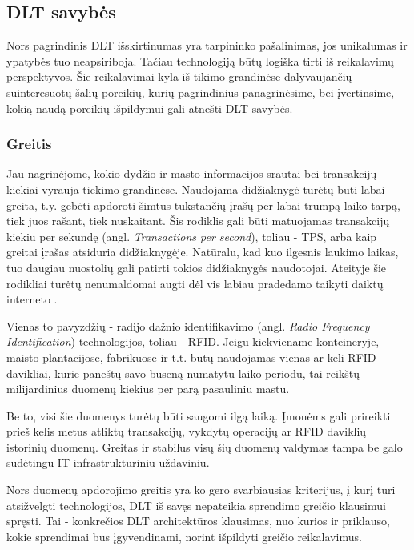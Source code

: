 \subsection{DLT savybės}

Nors pagrindinis DLT išskirtinumas yra tarpininko pašalinimas, jos unikalumas ir ypatybės tuo neapsiriboja. Tačiau technologiją būtų logiška tirti iš reikalavimų perspektyvos. Šie reikalavimai kyla iš tikimo grandinėse dalyvaujančių suinteresuotų šalių poreikių, kurių pagrindinius panagrinėsime, bei įvertinsime, kokią naudą poreikių išpildymui gali atnešti DLT savybės.

\subsubsection{Greitis}

Jau nagrinėjome, kokio dydžio ir masto informacijos srautai bei transakcijų kiekiai vyrauja tiekimo grandinėse. Naudojama didžiaknygė turėtų būti labai greita, t.y. gebėti apdoroti šimtus tūkstančių įrašų per labai trumpą laiko tarpą, tiek juos rašant, tiek nuskaitant. Šis rodiklis gali būti matuojamas transakcijų kiekiu per sekundę (angl. \textit{Transactions per second}), toliau - TPS, arba kaip greitai įrašas atsiduria didžiaknygėje. Natūralu, kad kuo ilgesnis laukimo laikas, tuo daugiau nuostolių gali patirti tokios didžiaknygės naudotojai. Ateityje šie rodikliai turėtų nenumaldomai augti dėl vis labiau pradedamo taikyti daiktų interneto \cite{kaur2018edge}. 

Vienas to pavyzdžių - radijo dažnio identifikavimo (angl. \textit{Radio Frequency Identification}) technologijos, toliau - RFID. Jeigu kiekviename konteineryje, maisto plantacijose, fabrikuose ir t.t. būtų naudojamas vienas ar keli RFID davikliai, kurie paneštų savo būseną numatytu laiko periodu, tai reikštų milijardinius duomenų kiekius per parą pasauliniu mastu.

Be to, visi šie duomenys turėtų būti saugomi ilgą laiką. Įmonėms gali prireikti prieš kelis metus atliktų transakcijų, vykdytų operacijų ar RFID daviklių istorinių duomenų. Greitas ir stabilus visų šių duomenų valdymas tampa be galo sudėtingu IT infrastruktūriniu uždaviniu.

Nors duomenų apdorojimo greitis yra ko gero svarbiausias kriterijus, į kurį turi atsižvelgti technologijos, DLT iš savęs nepateikia sprendimo greičio klausimui spręsti. Tai - konkrečios DLT architektūros klausimas, nuo kurios ir priklauso, kokie sprendimai bus įgyvendinami, norint išpildyti greičio reikalavimus.


